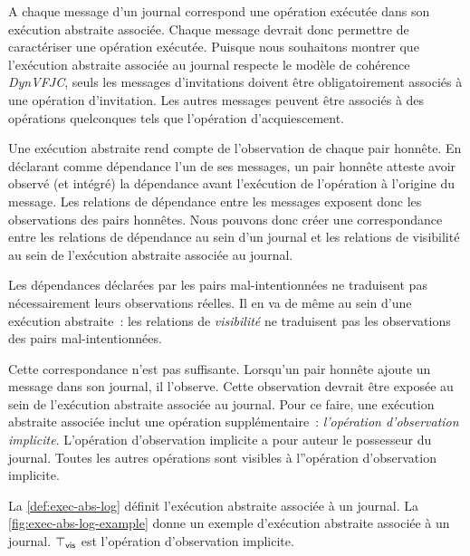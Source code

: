 A chaque message d'un journal correspond une opération exécutée dans son exécution abstraite associée.
Chaque message devrait donc permettre de caractériser une opération exécutée.
Puisque nous souhaitons montrer que l'exécution abstraite associée au journal respecte le modèle de cohérence \emph{DynVFJC}, seuls les messages d'invitations doivent être obligatoirement associés à une opération d'invitation.
Les autres messages peuvent être associés à des opérations quelconques tels que l'opération d'acquiescement.

Une exécution abstraite rend compte de l'observation de chaque pair honnête.
En déclarant comme dépendance l'un de ses messages, un pair honnête atteste avoir observé (et intégré) la dépendance avant l'exécution de l'opération à l'origine du message.
Les relations de dépendance entre les messages exposent donc les observations des pairs honnêtes.
Nous pouvons donc créer une correspondance entre les relations de dépendance au sein d'un journal et les relations de visibilité au sein de l'exécution abstraite associée au journal.

Les dépendances déclarées par les pairs mal-intentionnées ne traduisent pas nécessairement leurs observations réelles.
Il en va de même au sein d'une exécution abstraite~: les relations de \emph{visibilité} ne traduisent pas les observations des pairs mal-intentionnées.

Cette correspondance n'est pas suffisante.
Lorsqu'un pair honnête ajoute un message dans son journal, il l'observe.
Cette observation devrait être exposée au sein de l'exécution abstraite associée au journal.
Pour ce faire, une exécution abstraite associée inclut une opération supplémentaire~: \emph{l'opération d'observation implicite}.
L'opération d'observation implicite a pour auteur le possesseur du journal.
Toutes les autres opérations sont visibles à l''opération d'observation implicite.

La \autoref{def:exec-abs-log} définit l'exécution abstraite associée à un journal.
La \autoref{fig:exec-abs-log-example} donne un exemple d'exécution abstraite associée à un journal.
$\top_{\operatorname{\mathsf{vis}}}$ est l'opération d'observation implicite.

